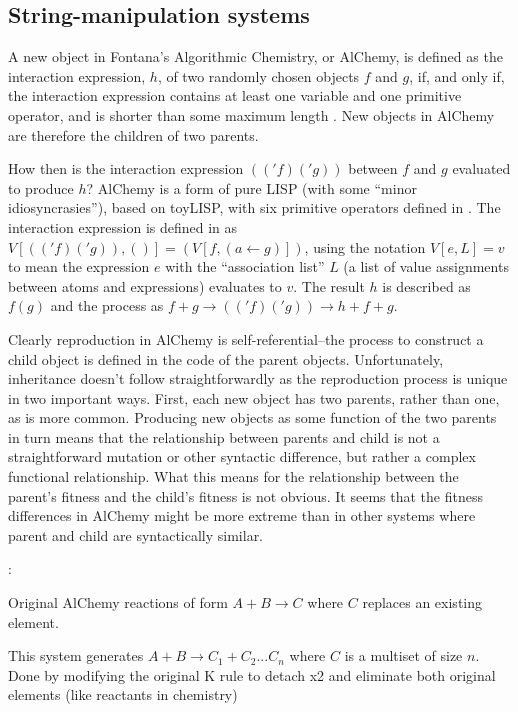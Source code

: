 \begin{NOTES}
\subsection{String-manipulation systems}
\cite{Fontana1992}

A new object in Fontana's Algorithmic Chemistry, or AlChemy, is defined as the interaction expression, $h$, of two randomly chosen objects $f$ and $g$, if, and only if, the interaction expression contains at least one variable and one primitive operator, and is shorter than some maximum length \parencite[p.173--p.180]{Fontana1992}. New objects in AlChemy are therefore the children of two parents.

How then is the interaction expression $(('f)('g))$ between $f$ and $g$ evaluated to produce $h$? AlChemy is a form of pure LISP (with some ``minor idiosyncrasies''), based on toyLISP, with six primitive operators defined in \cite[p.205]{Fontana1992}. The interaction expression is defined in \cite[Definition A.9, p.204]{Fontana1992} as $V[(('f)('g)),()] = (V[f,(a\leftarrow g)])$, using the notation $V[e,L]=v$ to mean the expression $e$ with the ``association list'' $L$ (a list of value assignments between atoms and expressions) evaluates to $v$. The result $h$ is described as $f(g)$ and the process as $f+g \rightarrow (('f)('g)) \rightarrow h + f + g$.

Clearly reproduction in AlChemy is self-referential--the process to construct a child object is defined in the code of the parent objects. Unfortunately, inheritance doesn't follow straightforwardly as the reproduction process is unique in two important ways. First, each new object has two parents, rather than one, as is more common. Producing new objects as some function of the two parents in turn means that the relationship between parents and child is not a straightforward mutation or other syntactic difference, but rather a complex functional relationship. What this means for the relationship between the parent's fitness and the child's fitness is not obvious. It seems that the fitness differences in AlChemy might be more extreme than in other systems where parent and child are syntactically similar.

\parencite{Fenizio2000}:

Original AlChemy reactions of form $A+B\rightarrow C$ where $C$ replaces an existing element.

This system generates $A+B\rightarrow C_1+C_2...C_n$ where $C$ is a multiset of size $n$. Done by modifying the original K rule to detach x2 and eliminate both original elements (like reactants in chemistry)


\end{NOTES}

